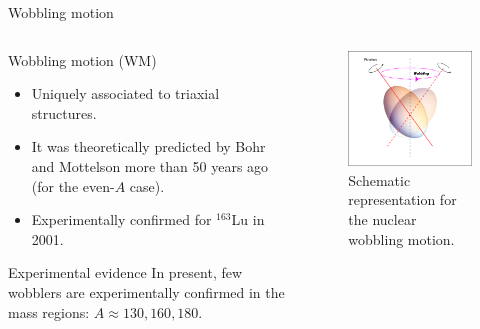 \documentclass{beamer}
\begin{document}
\begin{frame}{Wobbling motion}
\begin{columns}
    \begin{column}{0.5\textwidth}
    \begin{block}{Wobbling motion (WM)}
  \begin{itemize}
    \item Uniquely associated to triaxial structures. 
    \item It was theoretically predicted by Bohr and Mottelson more than 50 years ago (for the even-$A$ case).
    \item Experimentally confirmed for $^{163}$Lu in 2001.
  \end{itemize}
  \end{block}
  \begin{exampleblock}{Experimental evidence}
  In present, few wobblers are experimentally confirmed in the mass regions: $A\approx130,160,180$.
  \end{exampleblock}
  \end{column}
  \begin{column}{0.5\textwidth}
        \begin{figure}
          \centering
          \includegraphics[scale=0.35]{figs/wobbling_drawing.png}
          \caption{Schematic representation for the nuclear wobbling motion.}
          \label{wobbling_picture}
      \end{figure}
  \end{column}
  \end{columns}
\end{frame}
\end{document}
